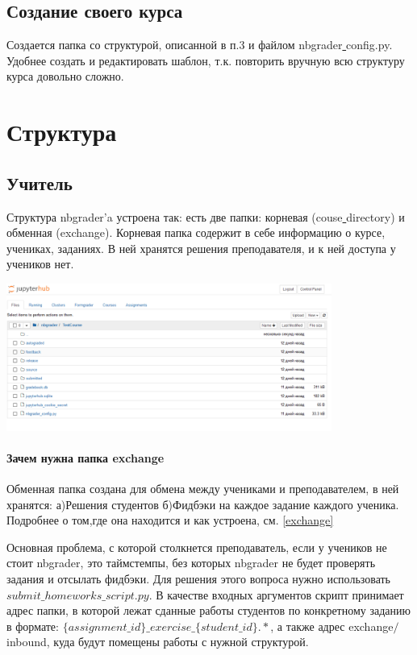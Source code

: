 \documentclass[a4paper,12pt]{article}
\begin{document}
\subsection{Создание своего курса}

Создается папка со структурой, описанной в п.3 и файлом nbgrader\underline{ }config.py. Удобнее создать и редактировать шаблон, т.к. повторить вручную всю структуру курса довольно сложно.
\section{Структура}

\subsection{Учитель}
Структура nbgrader'a устроена так: есть две папки: корневая (couse\underline{ }directory) и обменная (exchange). Корневая папка содержит в себе информацию о курсе, учениках, заданиях. В ней хранятся решения преподавателя, и к ней доступа у учеников нет.

\includegraphics[width=0.8\textwidth]{grader_root_directory}

\paragraph{Зачем нужна папка exchange}\label{exchange_why}
Обменная папка создана для обмена между учениками и преподавателем, в ней хранятся:  а)Решения студентов б)Фидбэки на каждое задание каждого ученика. Подробнее о том,где она находится и как устроена, см. \ref{exchange}


 Основная проблема, с которой столкнется преподаватель, если у учеников не стоит nbgrader, это таймстемпы, без которых nbgrader не будет проверять задания и отсылать фидбэки. Для решения этого вопроса нужно использовать $submit\_homeworks\_script.py$. В качестве входных аргументов скрипт принимает адрес папки, в которой лежат сданные работы студентов по конкретному заданию в формате:
 \newline
 ${\{assignment\_id\}\_exercise\_\{student\_id\}.*}$, а также адрес exchange$/$inbound, куда будут помещены работы с нужной структурой.
 
\end{document}
